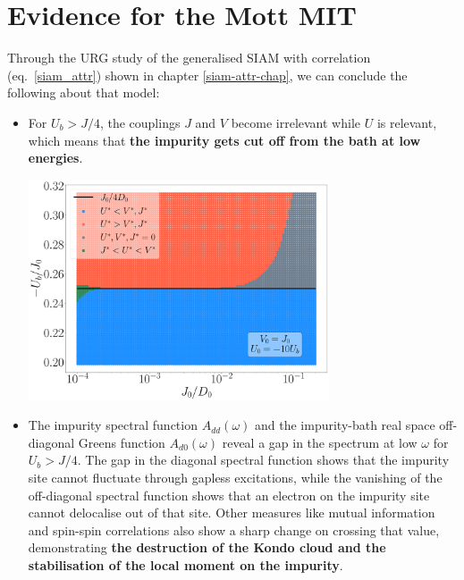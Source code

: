 \documentclass[10pt]{report}
\numberwithin{equation}{section}
\begin{document}
\section{Evidence for the Mott MIT}
Through the URG study of the generalised SIAM with correlation (eq.~\ref{siam_attr}) shown in chapter \ref{siam-attr-chap}, we can conclude the following about that model:
\begin{itemize}
	\item For \(U_b > J/4\), the couplings \(J\) and \(V\) become irrelevant while \(U\) is relevant, which means that \textbf{the impurity gets cut off from the bath at low energies}.
\begin{center}
	\includegraphics[width=0.7\textwidth]{../figures/phase-map-MIT.pdf}
\end{center}
\item The impurity spectral function \(A_{dd}(\omega)\) and the impurity-bath real space off-diagonal Greens function \(A_{d0}(\omega)\) reveal a gap in the spectrum at low \(\omega\) for \(U_b > J/4\). The gap in the diagonal spectral function shows that the impurity site cannot fluctuate through gapless excitations, while the vanishing of the off-diagonal spectral function shows that an electron on the impurity site cannot delocalise out of that site.  Other measures like mutual information and spin-spin correlations also show a sharp change on crossing that value, demonstrating \textbf{the destruction of the Kondo cloud and the stabilisation of the local moment on the impurity}.


\end{itemize}
\end{document}
